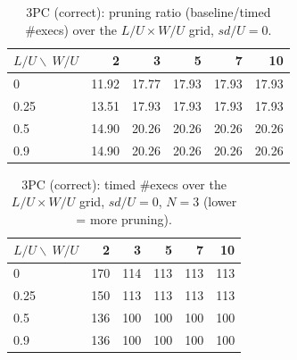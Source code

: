 \begin{table}[t]\centering
\caption{3PC (correct): pruning ratio (baseline/timed \#execs) over the $L/U\times W/U$ grid, $sd/U=0$.}
\begin{tabular}{lrrrrr}
\toprule
$L/U \backslash\ W/U$ & 2 & 3 & 5 & 7 & 10 \\
\midrule
0 & 11.92 & 17.77 & 17.93 & 17.93 & 17.93 \\
0.25 & 13.51 & 17.93 & 17.93 & 17.93 & 17.93 \\
0.5 & 14.90 & 20.26 & 20.26 & 20.26 & 20.26 \\
0.9 & 14.90 & 20.26 & 20.26 & 20.26 & 20.26 \\
\bottomrule
\end{tabular}
\end{table}

\begin{table}[t]\centering
\caption{3PC (correct): timed \#execs over the $L/U\times W/U$ grid, $sd/U=0$, $N=3$ (lower = more pruning).}
\begin{tabular}{lrrrrr}
\toprule
$L/U \backslash\ W/U$ & 2 & 3 & 5 & 7 & 10 \\
\midrule
0 & 170 & 114 & 113 & 113 & 113 \\
0.25 & 150 & 113 & 113 & 113 & 113 \\
0.5 & 136 & 100 & 100 & 100 & 100 \\
0.9 & 136 & 100 & 100 & 100 & 100 \\
\bottomrule
\end{tabular}
\end{table}